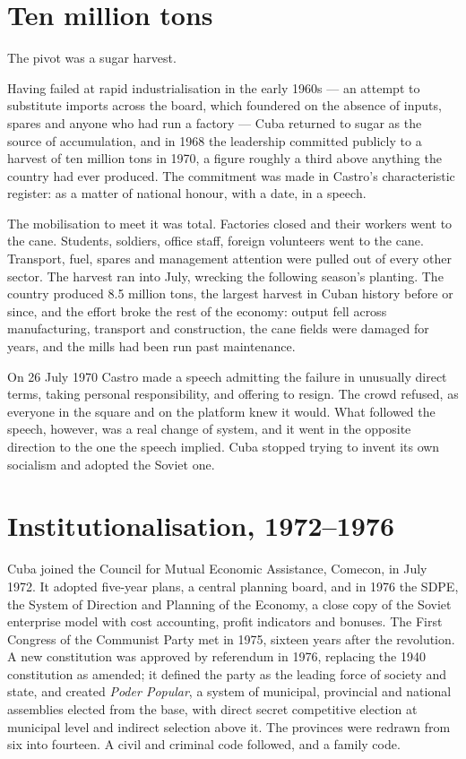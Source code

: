\section{Ten million tons}

The pivot was a sugar harvest.

Having failed at rapid industrialisation in the early 1960s --- an attempt to
substitute imports across the board, which foundered on the absence of inputs,
spares and anyone who had run a factory --- Cuba returned to sugar as the source
of accumulation, and in 1968 the leadership committed publicly to a harvest of
ten million tons in 1970, a figure roughly a third above anything the country
had ever produced. The commitment was made in Castro's characteristic register:
as a matter of national honour, with a date, in a speech.

The mobilisation to meet it was total. Factories closed and their workers went
to the cane. Students, soldiers, office staff, foreign volunteers went to the
cane. Transport, fuel, spares and management attention were pulled out of every
other sector. The harvest ran into July, wrecking the following season's
planting. The country produced 8.5 million tons, the largest harvest in Cuban
history before or since, and the effort broke the rest of the economy: output
fell across manufacturing, transport and construction, the cane fields were
damaged for years, and the mills had been run past maintenance.

On 26 July 1970 Castro made a speech admitting the failure in unusually direct
terms, taking personal responsibility, and offering to resign. The crowd
refused, as everyone in the square and on the platform knew it would. What
followed the speech, however, was a real change of system, and it went in the
opposite direction to the one the speech implied. Cuba stopped trying to invent
its own socialism and adopted the Soviet one.

\section{Institutionalisation, 1972--1976}

Cuba joined the Council for Mutual Economic Assistance, Comecon, in July 1972.
It adopted five-year plans, a central planning board, and in 1976 the SDPE,
the System of Direction and Planning of the Economy, a close copy of the Soviet
enterprise model with cost accounting, profit indicators and bonuses. The First
Congress of the Communist Party met in 1975, sixteen years after the
revolution. A new constitution was approved by referendum in 1976, replacing
the 1940 constitution as amended; it defined the party as the leading force of
society and state, and created \emph{Poder Popular}, a system of municipal,
provincial and national assemblies elected from the base, with direct secret
competitive election at municipal level and indirect selection above it. The
provinces were redrawn from six into fourteen. A civil and criminal code
followed, and a family code.

